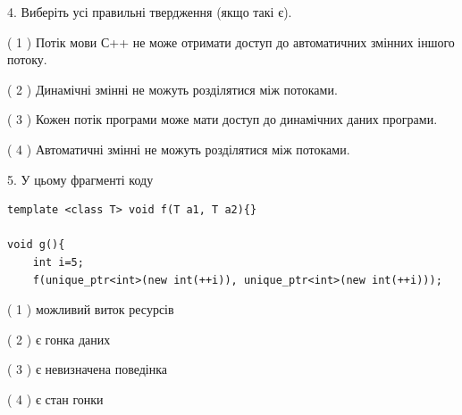 \documentclass[12pt, ukrainian]{article}
\begin{document}
\begin {large}
{%
4. Виберіть усі правильні твердження (якщо такі є).\par
\vspace{2mm}

( 1 ) Потік мови С++ не може отримати доступ до автоматичних змінних іншого потоку.%

( 2 ) Динамічні змінні не можуть розділятися між потоками.%

( 3 ) Кожен потік програми може мати доступ до динамічних даних програми.%

( 4 ) Автоматичні змінні не можуть розділятися між потоками.%


5. У цьому фрагменті коду
\begin{verbatim}
template <class T> void f(T a1, T a2){}

void g(){
    int i=5;
    f(unique_ptr<int>(new int(++i)), unique_ptr<int>(new int(++i)));
\end{verbatim}

( 1 ) можливий виток ресурсів%

( 2 ) є гонка даних%

( 3 ) є невизначена поведінка%

( 4 ) є стан гонки%
}
\end {large}
\end{document}
